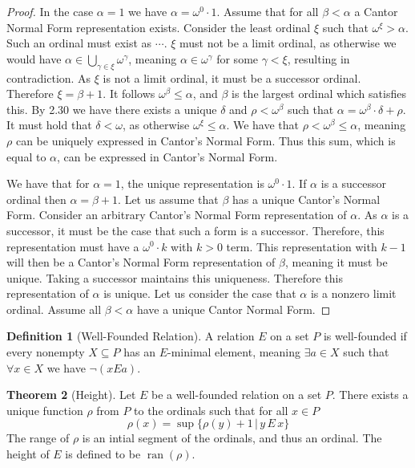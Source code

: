 \documentclass{article}
\theoremstyle{definition}
\newtheorem{thm}{Theorem}[section]
\newtheorem{defn}[thm]{Definition}
\DeclareMathOperator{\ran}{ran}
\begin{document}
\begin{proof}
    In the case $\alpha = 1$ we have $\alpha = \omega^0 \cdot 1$. Assume that for all $\beta < \alpha$ a Cantor Normal Form representation exists. Consider the least ordinal $\xi$ such that $\omega^\xi > \alpha$. Such an ordinal must exist as $\cdots$. $\xi$ must not be a limit ordinal, as otherwise we would have $\alpha \in \bigcup_{\gamma \in \xi} \omega^\gamma$, meaning $\alpha \in \omega^\gamma$ for some $\gamma < \xi$, resulting in contradiction. As $\xi$ is not a limit ordinal, it must be a successor ordinal. Therefore $\xi = \beta + 1$. It follows $\omega^\beta \le \alpha$, and $\beta$ is the largest ordinal which satisfies this. By 2.30 we have there exists a unique $\delta$ and $\rho < \omega^\beta$ such that $\alpha = \omega^\beta \cdot \delta + \rho$. It must hold that $\delta < \omega$, as otherwise $\omega^\xi \le \alpha$. We have that $\rho < \omega^\beta \le \alpha$, meaning $\rho$ can be uniquely expressed in Cantor's Normal Form. Thus this sum, which is equal to $\alpha$, can be expressed in Cantor's Normal Form.

    We have that for $\alpha = 1$, the unique representation is $\omega^0 \cdot 1$. If $\alpha$ is a successor ordinal then $\alpha = \beta + 1$. Let us assume that $\beta$ has a unique Cantor's Normal Form. Consider an arbitrary Cantor's Normal Form representation of $\alpha$. As $\alpha$ is a successor, it must be the case that such a form is a successor. Therefore, this representation must have a $\omega^0 \cdot k$ with $k > 0$ term. This representation with $k - 1$ will then be a Cantor's Normal Form representation of $\beta$, meaning it must be unique. Taking a successor maintains this uniqueness. Therefore this representation of $\alpha$ is unique. Let us consider the case that $\alpha$ is a nonzero limit ordinal. Assume all $\beta < \alpha$ have a unique Cantor Normal Form.
\end{proof}

\begin{defn}[Well-Founded Relation]
    A relation $E$ on a set $P$ is well-founded if every nonempty $X \subseteq P$ has an $E$-minimal element, meaning $\exists a \in X$ such that $\forall x \in X$ we have $\neg(x E a)$. 
\end{defn}

\begin{thm}[Height]
    Let $E$ be a well-founded relation on a set $P$. There exists a unique function $\rho$ from $P$ to the ordinals such that for all $x \in P$
    \[
        \rho(x) = \sup\{ \rho(y) + 1 \, | \, y \, E \, x \}    
    \]
    The range of $\rho$ is an intial segment of the ordinals, and thus an ordinal. The height of $E$ is defined to be $\ran(\rho)$.
\end{thm}
\end{document}
